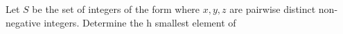 Let $S$ be the set of integers of the form  where $x,y,z$ are pairwise distinct non-negative integers.  Determine the h smallest element of 